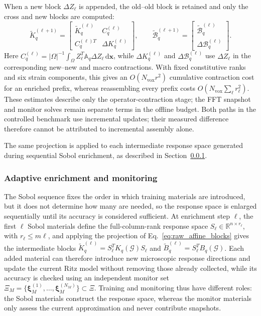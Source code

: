 \documentclass[pdflatex,sn-basic,Numbered]{sn-jnl}
\newcommand{\R}{\mathbb{R}}
\newcommand{\G}{\mathcal{G}}
\begin{document}
When a new block \(\Delta Z_\ell\) is appended, the old--old block is retained
and only the cross and new blocks are computed:
\begin{equation}
\widetilde K_q^{(\ell+1)}=
\begin{bmatrix}
\widetilde K_q^{(\ell)} & C_q^{(\ell)}\\
C_q^{(\ell)T} & \Delta K_q^{(\ell)}
\end{bmatrix},
\qquad
\widetilde{\mathcal B}_q^{(\ell+1)}=
\begin{bmatrix}
\widetilde{\mathcal B}_q^{(\ell)}\\
\Delta\mathcal B_q^{(\ell)}
\end{bmatrix}.
\end{equation}
Here \(C_q^{(\ell)}=|\Omega|^{-1}\int_\Omega
Z_\ell^T\mathbb A_q\Delta Z_\ell\,\mathrm d\boldsymbol x\), while
\(\Delta K_q^{(\ell)}\) and \(\Delta\mathcal B_q^{(\ell)}\) use
\(\Delta Z_\ell\) in the corresponding new--new and macro contractions.
With fixed constitutive ranks and six strain components, this gives an
\(O(N_{\mathrm{vox}}r^2)\) cumulative contraction cost for an enriched
prefix, whereas reassembling every prefix costs
\(O(N_{\mathrm{vox}}\sum_\ell r_\ell^2)\). These estimates describe only
the operator-contraction stage; the FFT snapshot and monitor solves remain
separate terms in the offline budget. Both paths in the controlled benchmark
use incremental updates; their measured difference therefore cannot be
attributed to incremental assembly alone.

The same projection is applied to each intermediate response space generated
during sequential Sobol enrichment, as described in
Section~\ref{subsubsec:adaptive_training}.

\subsubsection{Adaptive enrichment and monitoring}
\label{subsubsec:adaptive_training}

The Sobol sequence fixes the order in which training materials are introduced,
but it does not determine how many are needed, so the response space is
enlarged sequentially until its accuracy is considered sufficient. At
enrichment step \(\ell\), the first \(\ell\) Sobol materials define the
full-column-rank response space
\(S_\ell\in\R^{n\times r_\ell}\), with \(r_\ell\leq m\ell\), and applying the
projection of Eq.~\eqref{eq:raw_affine_blocks} gives the intermediate blocks
\(\widetilde K_q^{(\ell)}=S_\ell^TK_q(\G)S_\ell\) and
\(\widetilde B_q^{(\ell)}=S_\ell^TB_q(\G)\). Each added material can therefore
introduce new microscopic response directions and update the current Ritz
model without removing those already collected, while its accuracy is checked
using an independent monitor set
\(\Xi_M=\{\boldsymbol\xi_M^{(1)},\ldots,
\boldsymbol\xi_M^{(N_M)}\}\subset\Xi\). Training and monitoring thus have
different roles: the Sobol materials construct the response space, whereas
the monitor materials only assess the current approximation and never
contribute snapshots.
\end{document}
